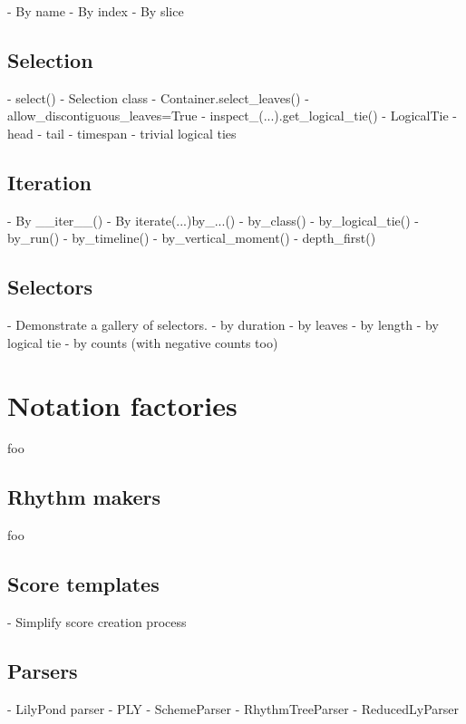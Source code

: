 \begin{markdown}
-   By name
-   By index
-   By slice
\end{markdown}

\subsection{Selection}
\label{ssec:selection}

\begin{markdown}
-   select()
-   Selection class
-   Container.select_leaves()
    -   allow_discontiguous_leaves=True
-   inspect_(...).get_logical_tie()
-   LogicalTie
    -   head
    -   tail
    -   timespan
    -   trivial logical ties
\end{markdown}

\subsection{Iteration}
\label{ssec:iteration}

\begin{markdown}
-   By __iter__()
-   By iterate(...)by_...()
    -   by_class()
    -   by_logical_tie()
    -   by_run()
    -   by_timeline()
    -   by_vertical_moment()
    -   depth_first()
\end{markdown}

\subsection{Selectors}
\label{ssec:selectors}

\begin{markdown}
-   Demonstrate a gallery of selectors.
    -   by duration
    -   by leaves
    -   by length
    -   by logical tie
    -   by counts (with negative counts too)
\end{markdown}

\section{Notation factories}

foo

\subsection{Rhythm makers}

foo

\subsection{Score templates}
\label{ssec:score-templates}

\begin{markdown}
-   Simplify score creation process
\end{markdown}

\subsection{Parsers}

\begin{markdown}
-   LilyPond parser
-   PLY
-   SchemeParser
-   RhythmTreeParser
-   ReducedLyParser
\end{markdown}